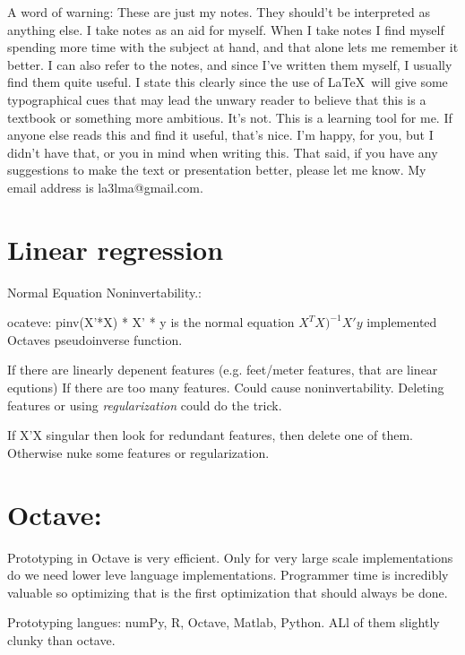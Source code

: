 \documentclass[a4, 12pt, english, USenglish]{scrreprt}
\newcommand{\idx}[1]{{\em #1}\index{#1}}
\begin{document}
A word of warning: These are just my notes.  They should't be
interpreted as anything else.  I take notes as an aid for myself.
When I take notes I find myself spending more time with the subject at
hand, and that alone lets me remember it better.  I can also refer to
the notes, and since I've written them myself, I usually find them
quite useful.   I state this clearly since the use of \LaTeX\ will
give some typographical cues that may lead the unwary reader to
believe that this is a textbook or something more ambitious.  It's
not.  This is a learning tool for me.  If anyone else reads this and
find it useful, that's nice. I'm happy,  for you, but I didn't have
that, or you in mind when writing this.   That said, if you have any
suggestions to make the text or presentation better, please let me
know.  My email address is la3lma@gmail.com.

\chapter{Linear regression}

Normal Equation Noninvertability.:

ocateve: pinv(X'*X) * X' * y  is the normal equation \(X^TX)^{-1} X' y\) implemented Octaves pseudoinverse function.

If there are linearly depenent features (e.g. feet/meter features, that are linear equtions)
If there are too many features. Could cause noninvertability.  Deleting features or using
\idx{regularization} could do the trick.


If X'X singular then look for redundant features, then delete one of them.  Otherwise nuke some features or regularization.


\chapter{Octave:}

Prototyping in Octave is very efficient.  Only for very large scale
implementations do we need lower leve language implementations.
Programmer time is incredibly valuable so optimizing that is the first
optimization that should always be done.

Prototyping langues: numPy, R, Octave, Matlab, Python.   ALl of them slightly clunky than octave.
\end{document}
